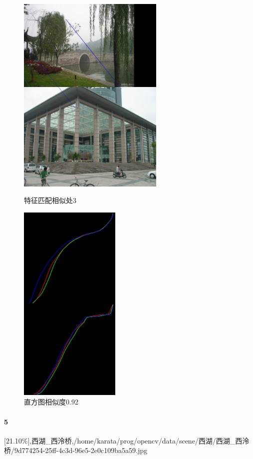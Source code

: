 \begin{figure}[htb]
\begin{minipage}[t]{0.5\linewidth}
\centering
\includegraphics[height=3.8in]{西泠.jpg.d/im4sift.jpg}
\caption{特征匹配相似处3}
\label{fig:side:a}
\end{minipage}%
\begin{minipage}[t]{0.5\linewidth}
\centering
\includegraphics[height=3.8in]{西泠.jpg.d/im4hist2.jpg}
\caption{直方图相似度0.92}
\label{fig:side:a}
\end{minipage}%
\end{figure}

\paragraph{5}
[21.10\%],西湖_西泠桥,/home/karata/prog/opencv/data/scene/西湖/西湖_西泠桥/9d774254-25ff-4c3d-96e5-2e0c109ba5a59.jpg

